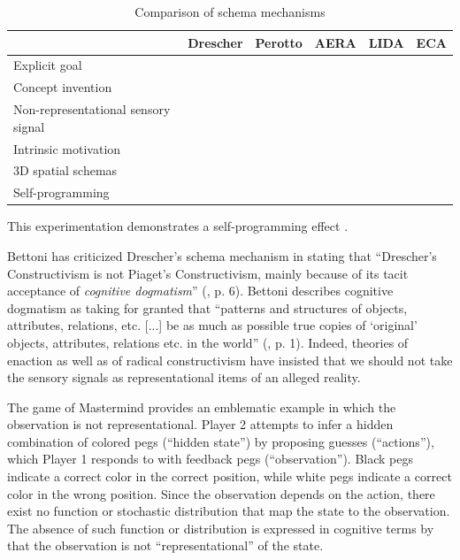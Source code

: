 \documentclass[runningheads]{llncs}
\begin{document}
\begin{table}
	\centering
	\caption{Comparison of schema mechanisms}\label{tab:comp}
	\begin{tabular}{|l|c|c|c|c|c|}
		\hline
		&  Drescher & Perotto & AERA & LIDA & ECA \\
		\hline
		Explicit goal & \checkmark & \checkmark & \checkmark & \checkmark &  \\
		Concept invention & \checkmark & \checkmark &  &  &  \\
		Non-representational sensory signal &  &  &  & \checkmark & \checkmark \\
		Intrinsic motivation &    &  &  & \checkmark & \checkmark \\
		3D spatial schemas &    &  &  & \checkmark & \checkmark \\
		Self-programming &    &  & &  & \checkmark \\
		\hline
	\end{tabular}
\end{table}

This experimentation demonstrates a self-programming effect \cite{georgeon_cash_2019}.


Bettoni  has criticized Drescher's schema mechanism in stating that ``Drescher's Constructivism is not Piaget's Constructivism, mainly because of its tacit acceptance of \textit{cognitive dogmatism}'' (\cite{bettoni_made-up_1993}, p. 6).
Bettoni describes cognitive dogmatism as taking for granted that ``patterns and structures of objects, attributes, relations, etc. [...] be as much as possible true copies of `original' objects, attributes, relations etc. in the world'' (\cite{bettoni_made-up_1993}, p. 1).
Indeed, theories of enaction as well as of radical constructivism have insisted that we should not take the sensory signals as representational items of an alleged reality. 


The game of Mastermind provides an emblematic example in which the observation is not representational. 
Player 2 attempts to infer a hidden combination of colored pegs (``hidden state'') by proposing guesses (``actions''), which Player 1 responds to with feedback pegs (``observation''). Black pegs indicate a correct color in the correct position, while white pegs indicate a correct color in the wrong position.
Since the observation depends on the action, there exist no function or stochastic distribution that map the state to the observation. 
The absence of such function or distribution is expressed in cognitive terms by that the observation is not ``representational'' of the state.
\end{document}
